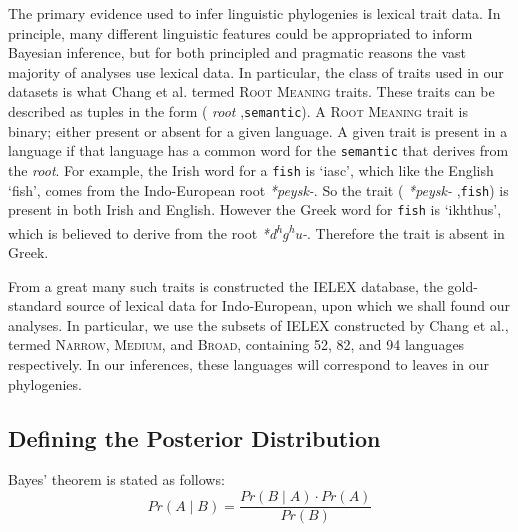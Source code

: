\documentclass[10pt,journal,compsoc]{IEEEtran}
\newcommand{\ts}{\textsuperscript}
\begin{document}
The primary evidence used to infer linguistic phylogenies is lexical trait data. In principle, many different linguistic features could be appropriated to inform Bayesian inference, but for both principled and pragmatic reasons the vast majority of analyses use lexical data. In particular, the class of traits used in our datasets is what Chang et al. termed \textsc{Root Meaning} traits. These traits can be described as tuples in the form (\textit{ root },\;\texttt{semantic}\;). A \textsc{Root Meaning} trait is binary; either present or absent for a given language. A given trait is present in a language if that language has a common word for the \texttt{semantic} that derives from the \textit{root}. For example, the Irish word for a \texttt{fish} is `iasc', which like the English `fish', comes from the Indo-European root \textit{*peysk-}. So the trait (\textit{ *peysk- },\;\texttt{fish}\;) is present in both Irish and English. However the Greek word for \texttt{fish} is `ikhthus', which is believed to derive from the root \textit{*d\ts{h}g\ts{h}u-}. Therefore the trait is absent in Greek.

From a great many such traits is constructed the IELEX database, the gold-standard source of lexical data for Indo-European, upon which we shall found our analyses. In particular, we use the subsets of IELEX constructed by Chang et al., termed \textsc{Narrow}, \textsc{Medium}, and \textsc{Broad}, containing 52, 82, and 94 languages respectively. In our inferences, these languages will correspond to leaves in our phylogenies.

\subsection{Defining the Posterior Distribution}

Bayes' theorem is stated as follows:
\begin{equation}
    Pr(A\;|\;B) = \frac{Pr(B\;|\;A) \cdot Pr(A)}{Pr(B)}
\end{equation}
\end{document}
